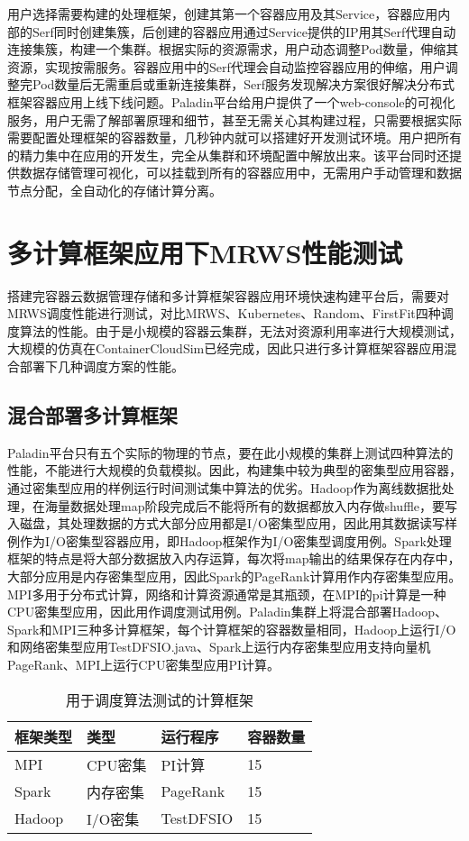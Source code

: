 用户选择需要构建的处理框架，创建其第一个容器应用及其Service，容器应用内部的Serf同时创建集簇，后创建的容器应用通过Service提供的IP用其Serf代理自动连接集簇，构建一个集群。根据实际的资源需求，用户动态调整Pod数量，伸缩其资源，实现按需服务。容器应用中的Serf代理会自动监控容器应用的伸缩，用户调整完Pod数量后无需重启或重新连接集群，Serf服务发现解决方案很好解决分布式框架容器应用上线下线问题。Paladin平台给用户提供了一个web-console的可视化服务，用户无需了解部署原理和细节，甚至无需关心其构建过程，只需要根据实际需要配置处理框架的容器数量，几秒钟内就可以搭建好开发测试环境。用户把所有的精力集中在应用的开发生，完全从集群和环境配置中解放出来。该平台同时还提供数据存储管理可视化，可以挂载到所有的容器应用中，无需用户手动管理和数据节点分配，全自动化的存储计算分离。

\section{多计算框架应用下MRWS性能测试}
搭建完容器云数据管理存储和多计算框架容器应用环境快速构建平台后，需要对MRWS调度性能进行测试，对比MRWS、Kubernetes、Random、FirstFit四种调度算法的性能。由于是小规模的容器云集群，无法对资源利用率进行大规模测试，大规模的仿真在ContainerCloudSim已经完成，因此只进行多计算框架容器应用混合部署下几种调度方案的性能。

\subsection{混合部署多计算框架}
Paladin平台只有五个实际的物理的节点，要在此小规模的集群上测试四种算法的性能，不能进行大规模的负载模拟。因此，构建集中较为典型的密集型应用容器，通过密集型应用的样例运行时间测试集中算法的优劣。Hadoop作为离线数据批处理，在海量数据处理map阶段完成后不能将所有的数据都放入内存做shuffle，要写入磁盘，其处理数据的方式大部分应用都是I/O密集型应用，因此用其数据读写样例作为I/O密集型容器应用，即Hadoop框架作为I/O密集型调度用例。Spark处理框架的特点是将大部分数据放入内存运算，每次将map输出的结果保存在内存中，大部分应用是内存密集型应用，因此Spark的PageRank计算用作内存密集型应用。MPI多用于分布式计算，网络和计算资源通常是其瓶颈，在MPI的pi计算是一种CPU密集型应用，因此用作调度测试用例。Paladin集群上将混合部署Hadoop、Spark和MPI三种多计算框架，每个计算框架的容器数量相同，Hadoop上运行I/O和网络密集型应用TestDFSIO.java、Spark上运行内存密集型应用支持向量机PageRank、MPI上运行CPU密集型应用PI计算。
\begin{table}[H]
	\centering\dawu[1.3]
	\caption{用于调度算法测试的计算框架}
	\begin{tabular}{|p{2cm}<{\centering}|p{2cm}<{\centering}|p{2cm}<{\centering}|p{2cm}<{\centering}|} \hline
		框架类型 & 类型 & 运行程序 & 容器数量 \\ \hline
		MPI & CPU密集 & PI计算 & 15 \\ \hline
		Spark & 内存密集 & PageRank & 15  \\ \hline
		Hadoop & I/O密集 & TestDFSIO & 15  \\ \hline
	\end{tabular}
\end{table}

